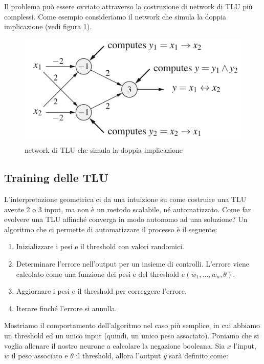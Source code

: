 \documentclass[10pt,a4paper]{article}
\begin{document}
Il problema può essere ovviato attraverso la costruzione di network di TLU più complessi. Come esempio consideriamo il network che simula la doppia implicazione (vedi figura \ref{fig:4}).

\begin{figure}
\centering
\includegraphics[scale=0.5]{img/netTLU.png}
\caption{network di TLU che simula la doppia implicazione}
\label{fig:4}
\end{figure}

\subsection{Training delle TLU}

L'interpretazione geometrica ci da una intuizione su come costruire una TLU avente 2 o 3 input, ma non è un metodo scalabile, né automatizzato. Come far evolvere una TLU affinché converga in modo autonomo ad una soluzione?
Un algoritmo che ci permette di automatizzare il processo è il seguente:

\begin{enumerate}
\item{Inizializzare i pesi e il threshold con valori randomici.}
\item{Determinare l'errore nell'output per un insieme di controlli. L'errore viene calcolato come una funzione dei pesi e del threshold $e(w_1,\dots,w_n,\theta)$.}
\item{Aggiornare i pesi e il threshold per correggere l'errore.}
\item{Iterare finché l'errore si annulla.}
\end{enumerate}

Mostriamo il comportamento dell'algoritmo nel caso più semplice, in cui abbiamo un threshold ed un unico input (quindi, un unico peso associato). Poniamo che si voglia allenare il nostro neurone a calcolare la negazione booleana. Sia $x$ l'input, $w$ il peso associato e $\theta$ il threshold, allora l'output $y$ sarà definito come:
\end{document}
